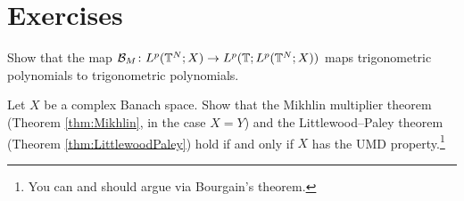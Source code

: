 \section*{Exercises}

\begin{exercise}\label{ex:B-trigpoly}
  Show that the map $\mathcal{B}_{M} \colon L^p(\mathbb{T}^{N};X) \to L^p(\mathbb{T};L^p(\mathbb{T}^{N};X))$ maps trigonometric polynomials to trigonometric polynomials.
\end{exercise}

\begin{exercise}
  Let $X$ be a complex Banach space.
  Show that the Mikhlin multiplier theorem (Theorem \ref{thm:Mikhlin}, in the case $X = Y$) and the Littlewood--Paley theorem (Theorem \ref{thm:LittlewoodPaley}) hold if and only if $X$ has the UMD property.\footnote{You can and should argue via Bourgain's theorem.}
\end{exercise}




